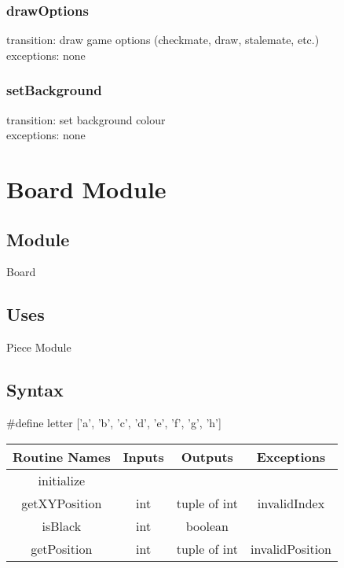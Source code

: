 \documentclass{article}
\begin{document}
        \subsubsection*{drawOptions}
            transition: draw game options (checkmate, draw, stalemate, etc.) \\
            exceptions: none 

        \subsubsection*{setBackground}
            transition: set background colour \\
            exceptions: none 

\newpage
\section*{Board Module}
    \subsection*{Module}
        Board
    
    \subsection*{Uses}
        Piece Module
    
    \subsection*{Syntax}
        \#define letter ['a', 'b', 'c', 'd', 'e', 'f', 'g', 'h']
        
        \begin{center}
            \begin{tabular}{|c|c|c|c|} 
                \hline
                Routine Names & Inputs & Outputs & Exceptions \\
                \hline
                initialize &  &  & \\ 
                \hline
                getXYPosition & int & tuple of int & invalidIndex \\ 
                \hline
                isBlack & int & boolean & \\ 
                \hline
                getPosition & int & tuple of int & invalidPosition \\ 
                \hline
            \end{tabular}
        \end{center}
    
\end{document}

